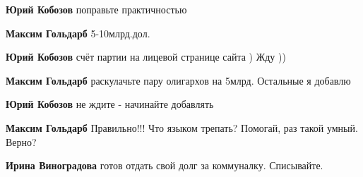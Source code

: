 \begin{itemize}
\begin{itemize}
\textbf{Юрий Кобозов} поправьте практичностью

 
\textbf{Максим Гольдарб} 5-10млрд.дол.

 
\textbf{Юрий Кобозов} счёт партии на лицевой странице сайта )
Жду ))

 
\textbf{Максим Гольдарб} раскулачьте пару олигархов на 5млрд. Остальные я добавлю

 
\textbf{Юрий Кобозов} не ждите - начинайте добавлять

 
\textbf{Максим Гольдарб} Правильно!!! Что языком трепать? Помогай, раз такой умный. Верно?

 
\textbf{Ирина Виноградова} готов отдать свой долг за коммуналку. Списывайте.

 

\end{itemize}
\end{itemize}
